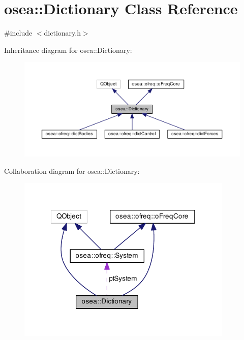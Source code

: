 \hypertarget{classosea_1_1_dictionary}{\section{osea\-:\-:Dictionary Class Reference}
\label{classosea_1_1_dictionary}
}


{\ttfamily \#include $<$dictionary.\-h$>$}



Inheritance diagram for osea\-:\-:Dictionary\-:\nopagebreak
\begin{figure}[H]
\begin{center}
\leavevmode
\includegraphics[width=350pt]{classosea_1_1_dictionary__inherit__graph}
\end{center}
\end{figure}


Collaboration diagram for osea\-:\-:Dictionary\-:\nopagebreak
\begin{figure}[H]
\begin{center}
\leavevmode
\includegraphics[width=291pt]{classosea_1_1_dictionary__coll__graph}
\end{center}
\end{figure}
